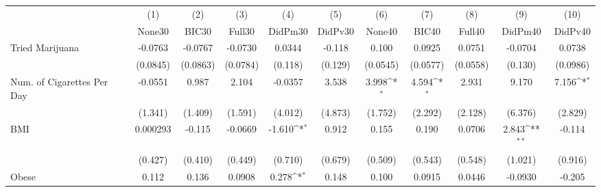 {
\def\sym#1{\ifmmode^{#1}\else\(^{#1}\)\fi}
\begin{tabular}{l*{10}{c}}
\toprule
            &\multicolumn{1}{c}{(1)}&\multicolumn{1}{c}{(2)}&\multicolumn{1}{c}{(3)}&\multicolumn{1}{c}{(4)}&\multicolumn{1}{c}{(5)}&\multicolumn{1}{c}{(6)}&\multicolumn{1}{c}{(7)}&\multicolumn{1}{c}{(8)}&\multicolumn{1}{c}{(9)}&\multicolumn{1}{c}{(10)}\\
            &\multicolumn{1}{c}{None30}&\multicolumn{1}{c}{BIC30}&\multicolumn{1}{c}{Full30}&\multicolumn{1}{c}{DidPm30}&\multicolumn{1}{c}{DidPv30}&\multicolumn{1}{c}{None40}&\multicolumn{1}{c}{BIC40}&\multicolumn{1}{c}{Full40}&\multicolumn{1}{c}{DidPm40}&\multicolumn{1}{c}{DidPv40}\\
\midrule
Tried Marijuana&     -0.0763         &     -0.0767         &     -0.0730         &      0.0344         &      -0.118         &       0.100         &      0.0925         &      0.0751         &     -0.0704         &      0.0738         \\
            &    (0.0845)         &    (0.0863)         &    (0.0784)         &     (0.118)         &     (0.129)         &    (0.0545)         &    (0.0577)         &    (0.0558)         &     (0.130)         &    (0.0986)         \\
\addlinespace
Num. of Cigarettes Per Day&     -0.0551         &       0.987         &       2.104         &     -0.0357         &       3.538         &       3.998\sym{*}  &       4.594\sym{*}  &       2.931         &       9.170         &       7.156\sym{*}  \\
            &     (1.341)         &     (1.409)         &     (1.591)         &     (4.012)         &     (4.873)         &     (1.752)         &     (2.292)         &     (2.128)         &     (6.376)         &     (2.829)         \\
\addlinespace
BMI         &    0.000293         &      -0.115         &     -0.0669         &      -1.610\sym{*}  &       0.912         &       0.155         &       0.190         &      0.0706         &       2.843\sym{**} &      -0.114         \\
            &     (0.427)         &     (0.410)         &     (0.449)         &     (0.710)         &     (0.679)         &     (0.509)         &     (0.543)         &     (0.548)         &     (1.021)         &     (0.916)         \\
\addlinespace
Obese       &       0.112         &       0.136         &      0.0908         &       0.278\sym{*}  &       0.148         &       0.100         &      0.0915         &      0.0446         &     -0.0930         &      -0.205         \\

\end{tabular}}
